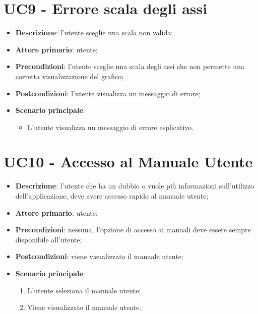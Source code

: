 \section{UC9 - Errore scala degli assi}
\begin{itemize}
  \item \textbf{Descrizione}: l'utente sceglie una scala non valida;
  \item \textbf{Attore primario}: utente;
  \item \textbf{Precondizioni}: l'utente sceglie una scala degli assi che non permette una corretta visualizzazione del grafico;
  \item \textbf{Postcondizioni}: l'utente visualizza un messaggio di errore;
  \item \textbf{Scenario principale}:
    \begin{itemize}
      \item L'utente visualizza un messaggio di errore esplicativo.
    \end{itemize}
\end{itemize}

\iffalse
\section{Accesso ai manuali}
\begin{figure}[h]
  \centering
  \texttt{[image: UC\_manuali]}
  \caption{UC6 UC7 - Accesso ai manuali utente e sviluppatore}
\end{figure}
\fi

\section{UC10 - Accesso al Manuale Utente}
\begin{itemize}
  \item \textbf{Descrizione}: l'utente che ha un dubbio o vuole più informazioni sull'utilizzo dell'applicazione, deve avere accesso rapido al manuale utente;
  \item \textbf{Attore primario}: utente;
  \item \textbf{Precondizioni}: nessuna, l'opzione di accesso ai manuali deve essere sempre disponibile all'utente;
  \item \textbf{Postcondizioni}: viene visualizzato il manuale utente;
  \item \textbf{Scenario principale}:
  \begin{enumerate}
    \item L'utente seleziona il manuale utente;
    \item Viene visualizzato il manuale utente.
  \end{enumerate}
\end{itemize}

